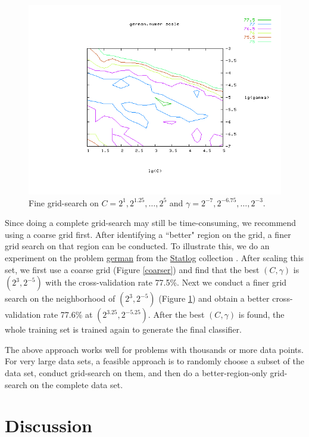 \documentclass[12pt]{article}
\begin{document}
\begin{figure}[htbp]
\begin{center}
\includegraphics[width=0.75\linewidth,viewport=145 55 625 450,clip]{finer.png}
\end{center}
\caption{Fine grid-search on $C=2^{1},2^{1.25},\ldots,2^{5}$ and 
$\gamma=2^{-7},2^{-6.75},\ldots,2^{-3}.$}
\label{finer}
\end{figure}

Since doing a complete grid-search may still be time-consuming, 
we recommend using a coarse grid first. 
After identifying a ``better" region on the
grid, a finer grid search on that region can 
be conducted. To illustrate this, we do an experiment on the problem
\href{http://www.csie.ntu.edu.tw/~cjlin/libsvmtools/binary/german.numer_scale}{{\sf german}} from the 
\href{http://www.ncc.up.pt/liacc/ML/statlog/datasets.html}{Statlog} 
collection \cite{DM94a}. After scaling this set,
we first use a coarse grid (Figure \ref{coarser}) and find that
the best $(C, \gamma)$ is $(2^3, 2^{-5})$ with the cross-validation rate 77.5\%.
Next we conduct a finer grid search on the neighborhood 
of $(2^3, 2^{-5})$ (Figure \ref{finer}) and obtain a better cross-validation 
rate 77.6\% at $(2^{3.25}, 2^{-5.25})$. After the best $(C, \gamma)$ is found, 
the whole training set is trained again
to generate the final classifier.

The above approach works well for problems with 
thousands or more data points. For very large data sets, 
a feasible approach is to randomly choose
a subset of the data set, conduct grid-search on
them, and then do a better-region-only grid-search on
the complete data set.

\section{Discussion}
\end{document}

